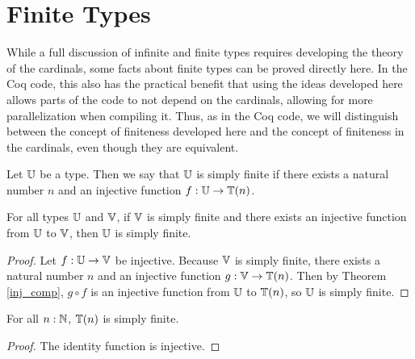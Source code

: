 \documentclass[../math.tex]{subfiles}
\begin{document}
\section{Finite Types}

While a full discussion of infinite and finite types requires developing the
theory of the cardinals, some facts about finite types can be proved directly
here.  In the Coq code, this also has the practical benefit that using the ideas
developed here allows parts of the code to not depend on the cardinals, allowing
for more parallelization when compiling it.  Thus, as in the Coq code, we will
distinguish between the concept of finiteness developed here and the concept of
finiteness in the cardinals, even though they are equivalent.

\begin{definition}
    Let $\mathbb{U}$ be a type.  Then we say that $\mathbb{U}$ is simply finite if there exists
    a natural number $n$ and an injective function $f : \mathbb{U} \to \mathbb{T}(n)$.
\end{definition}

\begin{theorem} \label{simple_finite_trans}
    For all types $\mathbb{U}$ and $\mathbb{V}$, if $\mathbb{V}$ is simply finite and there exists an
    injective function from $\mathbb{U}$ to $\mathbb{V}$, then $\mathbb{U}$ is simply finite.
\end{theorem}
\begin{proof}
    Let $f : \mathbb{U} \to \mathbb{V}$ be injective.  Because $\mathbb{V}$ is simply finite, there
    exists a natural number $n$ and an injective function $g : \mathbb{V} \to \mathbb{T}(n)$.
    Then by Theorem \ref{inj_comp}, $g \circ f$ is an injective function from
    $\mathbb{U}$ to $\mathbb{T}(n)$, so $\mathbb{U}$ is simply finite.
\end{proof}

\begin{theorem} \label{simple_finite_nat}
    For all $n : \mathbb{N}$, $\mathbb{T}(n)$ is simply finite.
\end{theorem}
\begin{proof}
    The identity function is injective.
\end{proof}
\end{document}
